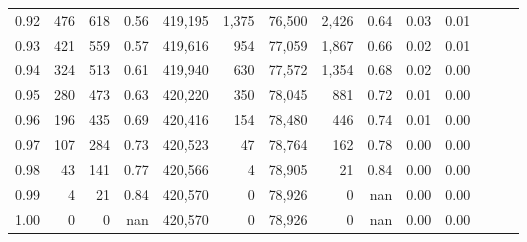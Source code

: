 \begin{tabular}{rrrrrrrrrrrrrr}
0.92 &    476 &    618 &  0.56 &  419,195 &    1,375 &  76,500 &   2,426 &  0.64 &  0.03 &      0.01 \\
0.93 &    421 &    559 &  0.57 &  419,616 &      954 &  77,059 &   1,867 &  0.66 &  0.02 &      0.01 \\
0.94 &    324 &    513 &  0.61 &  419,940 &      630 &  77,572 &   1,354 &  0.68 &  0.02 &      0.00 \\
0.95 &    280 &    473 &  0.63 &  420,220 &      350 &  78,045 &     881 &  0.72 &  0.01 &      0.00 \\
0.96 &    196 &    435 &  0.69 &  420,416 &      154 &  78,480 &     446 &  0.74 &  0.01 &      0.00 \\
0.97 &    107 &    284 &  0.73 &  420,523 &       47 &  78,764 &     162 &  0.78 &  0.00 &      0.00 \\
0.98 &     43 &    141 &  0.77 &  420,566 &        4 &  78,905 &      21 &  0.84 &  0.00 &      0.00 \\
0.99 &      4 &     21 &  0.84 &  420,570 &        0 &  78,926 &       0 &   nan &  0.00 &      0.00 \\
1.00 &      0 &      0 &   nan &  420,570 &        0 &  78,926 &       0 &   nan &  0.00 &      0.00 \\
\bottomrule
\end{tabular}
